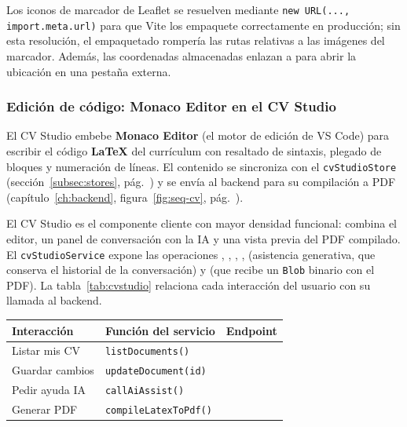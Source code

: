 \begin{NotaTecnica}
Los iconos de marcador de Leaflet se resuelven mediante \texttt{new URL(..., import.meta.url)}
para que Vite los empaquete correctamente en producción; sin esta resolución, el
empaquetado rompería las rutas relativas a las imágenes del marcador. Además, las
coordenadas almacenadas enlazan a  para abrir la ubicación en
una pestaña externa.
\end{NotaTecnica}

\subsubsection{Edición de código: Monaco Editor en el CV Studio}
\label{subsubsec:monaco}

El CV Studio embebe \textbf{Monaco Editor} (el motor de edición de VS Code) para escribir
el código \textbf{LaTeX} del currículum con resaltado de sintaxis, plegado de bloques y
numeración de líneas. El contenido se sincroniza con el \texttt{cvStudioStore}
(sección~\ref{subsec:stores}, pág.~\pageref{subsec:stores}) y se envía al backend para su
compilación a PDF (capítulo~\ref{ch:backend}, figura~\ref{fig:seq-cv},
pág.~\pageref{fig:seq-cv}).

El CV Studio es el componente cliente con mayor densidad funcional: combina el editor, un
panel de conversación con la IA y una vista previa del PDF compilado. El
\texttt{cvStudioService} expone las operaciones ,
, , ,
 (asistencia generativa, que conserva el historial de la
conversación) y  (que recibe un \texttt{Blob} binario con el
PDF). La tabla~\ref{tab:cvstudio} relaciona cada interacción del usuario con su llamada al
backend.

\vspace{0.2cm}
\noindent
\renewcommand{\arraystretch}{1.3}
\fontsize{8.5}{10.2}\selectfont\sffamily
\begin{tabularx}{\textwidth}{|L{3.6cm}|L{3.6cm}|Y|}
\hline
{}
\sffamily\textbf{Interacción} & \sffamily\textbf{Función del servicio} & \sffamily\textbf{Endpoint} \\
\hline
Listar mis CV & \texttt{listDocuments()} &  \\ \hline
{}
Guardar cambios & \texttt{updateDocument(id)} &  \\ \hline
Pedir ayuda IA & \texttt{callAiAssist()} &  \\ \hline
{}
Generar PDF & \texttt{compileLatexToPdf()} &  \\ \hline
\end{tabularx}
\label{tab:cvstudio}

